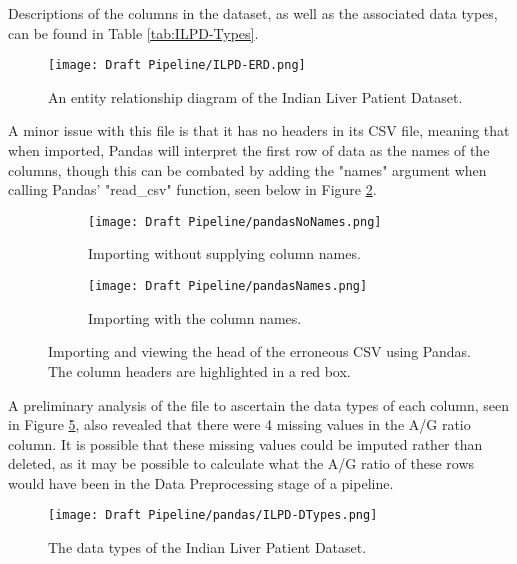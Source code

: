 Descriptions of the columns in the dataset, as well as the associated data types, can be found in Table \ref{tab:ILPD-Types}.

\begin{figure}[H]
    \centering
    \texttt{[image: Draft Pipeline/ILPD-ERD.png]}
    \caption{An entity relationship diagram of the Indian Liver Patient Dataset.}
    \label{fig:ILPD-ERD}
\end{figure}


A minor issue with this file is that it has no headers in its CSV file, meaning that when imported, Pandas will interpret the first 
row of data as the names of the columns, though this can be combated by adding the "names" argument when calling Pandas' "read\_csv" function,
seen below in Figure \ref{fig:pandasNames}. 

\begin{figure}[H]
    \centering
    \begin{subfigure}{0.75\textwidth}
       \texttt{[image: Draft Pipeline/pandasNoNames.png]}
       \caption{Importing without supplying column names.}
       \label{fig:pandasNames} 
    \end{subfigure}
    
    \begin{subfigure}{1\textwidth}
       \texttt{[image: Draft Pipeline/pandasNames.png]}
       \caption{Importing with the column names.}
       \label{fig:PN2}
    \end{subfigure}
    \caption{Importing and viewing the head of the erroneous CSV using Pandas. The column headers are highlighted in a red box.}
\end{figure}

A preliminary analysis of the file to ascertain the data types of each column, seen in Figure \ref{fig:ILPD-DTypes}, also revealed that there were 4 missing values in the A/G ratio column.
It is possible that these missing values could be imputed rather than deleted, as it may be possible to calculate what the A/G ratio of these rows would have been in the 
Data Preprocessing stage of a pipeline.

\begin{figure}[H]
    \centering
    \texttt{[image: Draft Pipeline/pandas/ILPD-DTypes.png]}
    \caption{The data types of the Indian Liver Patient Dataset.}
    \label{fig:ILPD-DTypes}
\end{figure}

